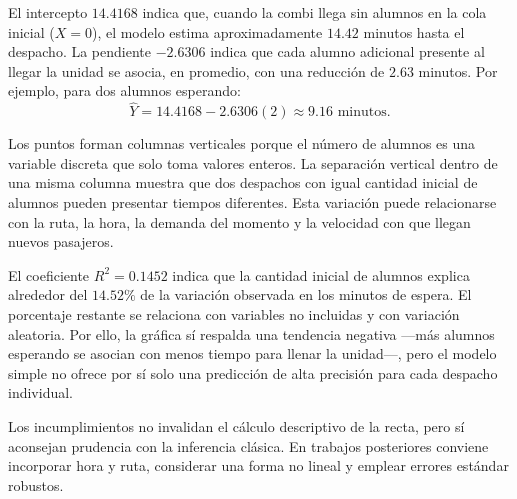 El intercepto $14.4168$ indica que, cuando la combi llega sin alumnos en la cola inicial
($X=0$), el modelo estima aproximadamente $14.42$ minutos hasta el despacho. La
pendiente $-2.6306$ indica que cada alumno adicional presente al llegar la unidad se
asocia, en promedio, con una reducción de $2.63$ minutos. Por ejemplo, para dos alumnos
esperando:
\begin{equation}
    \widehat{Y}=14.4168-2.6306(2)\approx9.16\text{ minutos}.
\end{equation}

Los puntos forman columnas verticales porque el número de alumnos es una variable
discreta que solo toma valores enteros. La separación vertical dentro de una misma
columna muestra que dos despachos con igual cantidad inicial de alumnos pueden presentar
tiempos diferentes. Esta variación puede relacionarse con la ruta, la hora, la demanda
del momento y la velocidad con que llegan nuevos pasajeros.

El coeficiente $R^2=0.1452$ indica que la cantidad inicial de alumnos explica alrededor
del $14.52\%$ de la variación observada en los minutos de espera. El porcentaje restante
se relaciona con variables no incluidas y con variación aleatoria. Por ello, la gráfica
sí respalda una tendencia negativa ---más alumnos esperando se asocian con menos tiempo
para llenar la unidad---, pero el modelo simple no ofrece por sí solo una predicción de
alta precisión para cada despacho individual.

Los incumplimientos no invalidan el cálculo descriptivo de la recta, pero sí aconsejan
prudencia con la inferencia clásica. En trabajos posteriores conviene incorporar hora y
ruta, considerar una forma no lineal y emplear errores estándar robustos.
